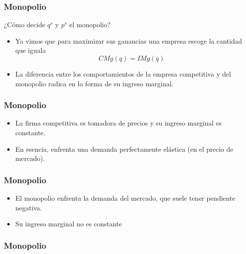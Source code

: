 \documentclass[dvipsnames,table,leqno]{beamer}
\newcommand{\peq}[1]{{\scriptscriptstyle{#1}}}
\newcommand{\rp}[1]{\left(#1\right)}
\begin{document}
		\begin{frame}
			\frametitle{Monopolio}
			¿Cómo decide $q^\peq{s}$ y $p^\peq{s}$ el monopolio?
			\begin{itemize}
				\item Ya vimos que para maximizar sus ganancias una empresa escoge la cantidad que iguala $$CMg\rp{q}=IMg\rp{q}$$
				\item La diferencia entre los comportamientos de la empresa competitiva y del monopolio radica en la forma de su ingreso marginal.
			\end{itemize}
		\end{frame}

		\begin{frame}
			\frametitle{Monopolio}
			\begin{itemize}
				\item La firma competitiva es tomadora de precios y su ingreso marginal es constante.
				\item En esencia, enfrenta una demanda perfectamente elástica (en el precio de mercado).
			\end{itemize}
		\end{frame}

		\begin{frame}
			\frametitle{Monopolio}
			\begin{itemize}
				\item El monopolio enfrenta la demanda del mercado, que suele tener pendiente negativa.
				\item Su ingreso marginal no es constante
			\end{itemize}
		\end{frame}

		\begin{frame}
			\frametitle{Monopolio}
			\begin{figure}[hbtp!]
				\centering
				\begin{subfigure}[b]{0.49\textwidth}
				\end{subfigure}
				\begin{subfigure}[b]{0.49\textwidth}
				\end{subfigure}
			\end{figure}
		\end{frame}
\end{document}
